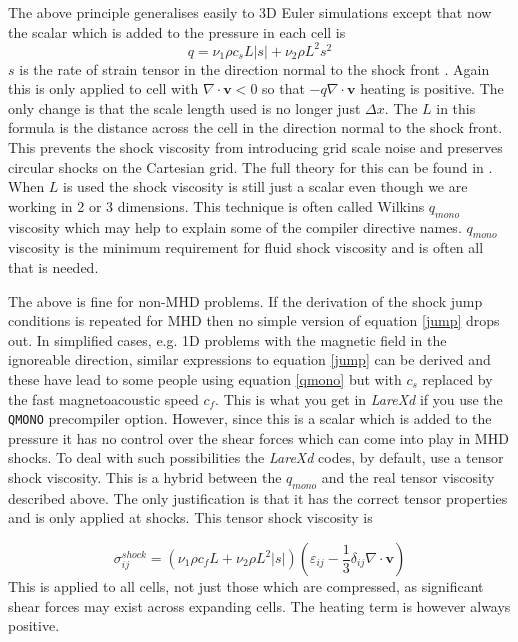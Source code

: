 \documentclass[11pt]{article}
\begin{document}
The above principle generalises easily to 3D Euler simulations except that now the scalar which is added to the pressure in each cell is
\begin{equation}
q = \nu_1 \rho c_s L|s| + \nu_2 \rho L^2 s^2 \label{qmono}
\end{equation}
$s$ is the rate of strain tensor in the direction normal to the shock front \cite{wilkins}. Again this is only applied to cell with $\nabla\cdot\mathbf{v}<0$ so that $-q \nabla\cdot\mathbf{v}$ heating is positive. The only change is that the scale length used is no longer just $\Delta x$. The $L$ in this formula is the distance across the cell in the direction normal to the shock front. This prevents the shock viscosity from introducing grid scale noise and preserves circular shocks on the Cartesian grid. The full theory for this can be found in \cite{wilkins}. When $L$ is used the shock viscosity is still just a scalar even though we are working in 2 or 3 dimensions. This technique is often called Wilkins $q_{mono}$ viscosity which may help to explain some of the compiler directive names. $q_{mono}$ viscosity is the minimum requirement for fluid shock viscosity and is often all that is needed.

The above is fine for non-MHD problems. If the derivation of the shock jump conditions is repeated for MHD then no simple version of equation \ref{jump} drops out. In simplified cases, e.g. 1D problems with the magnetic field in the ignoreable direction, similar expressions to equation \ref{jump} can be derived and these have lead to some people using  equation \ref{qmono} but with $c_s$ replaced by the fast magnetoacoustic speed $c_f$. This is what you get in {\it LareXd} if you use the \texttt{QMONO} precompiler option. However, since this is a scalar which is added to the pressure it has no control over the shear forces which can come into play in MHD shocks. To deal with such possibilities the {\it LareXd} codes, by default, use a tensor shock viscosity. This is a hybrid between the $q_{mono}$ and the real tensor viscosity described above. The only  justification is that it has the correct tensor properties and is only applied at shocks. This tensor shock viscosity is

\begin{equation}
\sigma_{ij}^{shock} =  (\nu_1 \rho c_f L + \nu_2 \rho L^2 |s|)  \left(\varepsilon_{ij}-\frac{1}{3}\delta_{ij}\nabla\cdot\mathbf{v}\right)   \label{shock}
\end{equation}
This is applied to all cells, not just those which are compressed, as significant shear forces may exist across expanding cells. The heating term is however always positive.
\end{document}
